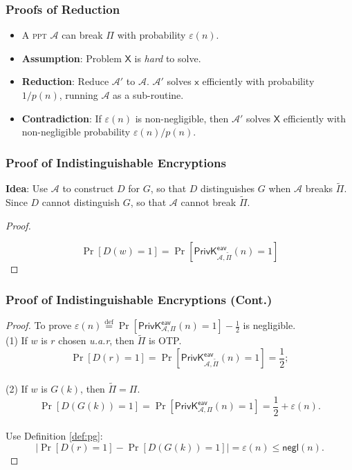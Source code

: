 \begin{frame}\frametitle{Proofs of Reduction}
\begin{figure}
\begin{center}

\end{center}
\end{figure}
\begin{itemize}
\item A \textsc{ppt} $\mathcal{A}$ can break $\Pi$ with probability $\varepsilon(n)$.
\item \textbf{Assumption}: Problem $\mathsf{X}$ is \emph{hard} to solve.
\item \textbf{Reduction}: Reduce $\mathcal{A}'$ to $\mathcal{A}$. $\mathcal{A'}$ solves $\mathsf{x}$ efficiently with probability $1/p(n)$, running $\mathcal{A}$ as a sub-routine. 
\item \textbf{Contradiction}: If $\varepsilon(n)$ is non-negligible, then $\mathcal{A'}$ solves $\mathsf{X}$ efficiently with non-negligible probability $\varepsilon(n)/p(n)$.
\end{itemize}
\end{frame}
\begin{frame}\frametitle{Proof of Indistinguishable Encryptions}
\textbf{Idea}: Use $\mathcal{A}$ to construct $D$ for $G$, so that $D$ distinguishes $G$ when $\mathcal{A}$ breaks $\tilde{\Pi}$. Since $D$ cannot distinguish $G$, so that $\mathcal{A}$ cannot break $\tilde{\Pi}$.
\begin{proof}
\begin{figure}
\begin{center}

\end{center}
\end{figure}
\[ \Pr[D(w)=1] = \Pr[\mathsf{PrivK}^{\mathsf{eav}}_{\mathcal{A},\tilde{\Pi}}(n)=1] \]
\end{proof}
\end{frame}
\begin{frame}\frametitle{Proof of Indistinguishable Encryptions (Cont.)}
\begin{proof}
To prove $ \varepsilon(n) \overset{\text{def}}{=} \Pr[\mathsf{PrivK}^{\mathsf{eav}}_{\mathcal{A},\Pi}(n)=1] - \frac{1}{2} $ is negligible.\\
(1) If $w$ is $r$ chosen \emph{u.a.r}, then $\tilde{\Pi}$ is OTP. \[\Pr[D(r)=1] = \Pr[\mathsf{PrivK}^{\mathsf{eav}}_{\mathcal{A},\tilde{\Pi}}(n)=1]=\frac{1}{2};\] \\
(2) If $w$ is $G(k)$, then $\tilde{\Pi} = \Pi$. 
\[ \Pr[D(G(k))=1] = \Pr[\mathsf{PrivK}^{\mathsf{eav}}_{\mathcal{A},\Pi}(n)=1] = \frac{1}{2} + \varepsilon(n). \]\\
Use Definition \ref{def:pg}: 
\[ \left|\Pr[D(r)=1] - \Pr[D(G(k))=1]\right| = \varepsilon(n) \le \mathsf{negl}(n).
\] 
\end{proof}
\end{frame}
